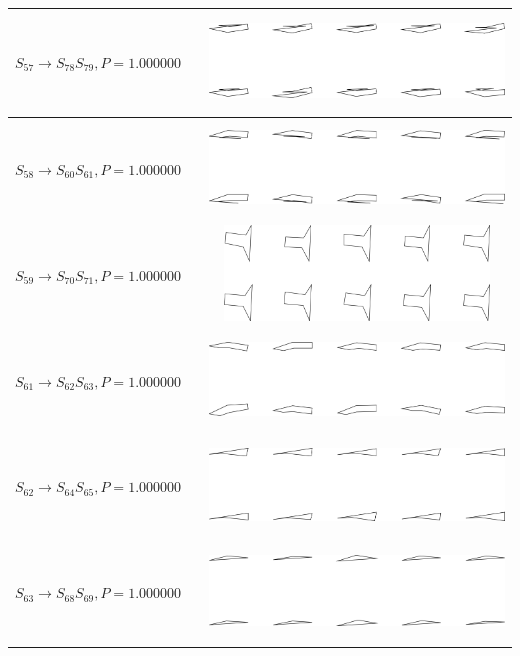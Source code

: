 \begin{tabular}{|l|c|c|}

\hline
$S_{57} \to S_{78} S_{79}, P=1.000000$ &  & \includegraphics[height=1in]{output/1.models/hand_built/romerchoice/gram.0030.sample.png} \\
\hline
$S_{58} \to S_{60} S_{61}, P=1.000000$ &  & \includegraphics[height=1in]{output/1.models/hand_built/romerchoice/gram.0031.sample.png} \\
\hline
$S_{59} \to S_{70} S_{71}, P=1.000000$ &  & \includegraphics[height=1in]{output/1.models/hand_built/romerchoice/gram.0032.sample.png} \\
\hline
$S_{61} \to S_{62} S_{63}, P=1.000000$ &  & \includegraphics[height=1in]{output/1.models/hand_built/romerchoice/gram.0033.sample.png} \\
\hline
$S_{62} \to S_{64} S_{65}, P=1.000000$ &  & \includegraphics[height=1in]{output/1.models/hand_built/romerchoice/gram.0034.sample.png} \\
\hline
$S_{63} \to S_{68} S_{69}, P=1.000000$ &  & \includegraphics[height=1in]{output/1.models/hand_built/romerchoice/gram.0035.sample.png} \\
\hline
\end{tabular}

